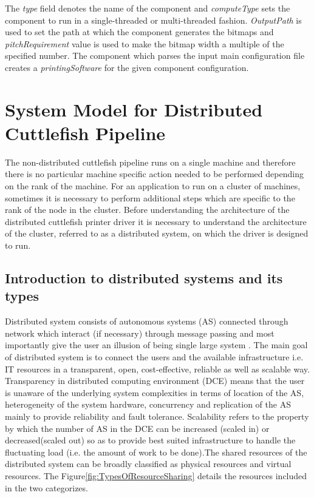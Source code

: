 The \textit{type} field denotes the name of the component and \textit{computeType} sets the component to run in a single-threaded or multi-threaded fashion. \textit{OutputPath} is used to set the path at which the component generates the bitmaps and \textit{pitchRequirement} value is used to make the bitmap width a multiple of the specified number. The component which parses the input main configuration file creates a \textit{printingSoftware} for the given component configuration. 

\section{System Model for Distributed Cuttlefish Pipeline}

The non-distributed cuttlefish pipeline runs on a single machine and therefore there is no particular machine specific action needed to be performed depending on the rank of the machine. For an application to run on a cluster of machines, sometimes it is necessary to perform additional steps which are specific to the rank of the node in the cluster. Before understanding the architecture of the distributed cuttlefish printer driver it is necessary to understand the architecture of the cluster, referred to as a distributed system, on which the driver is designed to run. 

\subsection{Introduction to distributed systems and its types}
Distributed system consists of autonomous systems (AS) connected through network which interact (if necessary) through message passing and most importantly give the user an illusion of being single large system \cite{DCE}. The main goal of distributed system is to connect the users and the available infrastructure i.e. IT resources in a transparent, open, cost-effective, reliable as well as scalable way. Transparency in distributed computing environment (DCE) means that the user is unaware of the underlying system complexities in terms of location of the AS, heterogeneity of the system hardware, concurrency and replication of the AS mainly to provide reliability and fault tolerance. Scalability refers to the property by which the number of AS in the DCE can be increased (scaled in) or decreased(scaled out) so as to provide best suited infrastructure to handle the fluctuating load (i.e. the amount of work to be done).The shared resources of the distributed system can be broadly classified as physical resources and virtual resources. The Figure\ref{fig:TypesOfResourceSharing} details the resources included in the two categorizes. 

